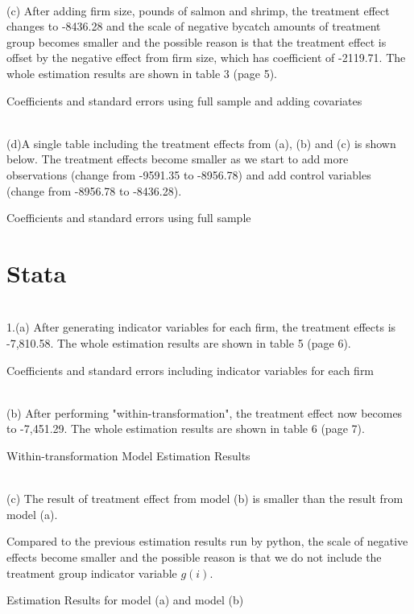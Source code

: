 \documentclass{article}
\begin{document}
~\\(c) After adding firm size, pounds of salmon and shrimp, the treatment effect changes to -8436.28 and the scale of negative bycatch amounts of treatment group becomes smaller and the possible reason is that the treatment effect is offset by the negative effect from firm size, which has coefficient of  -2119.71. The whole estimation results are shown in table 3 (page 5).

\begin{table}[ht]
	
	\small
	\centering
		
	\caption{Coefficients and standard errors using full sample and adding covariates}

\end{table}


~\\(d)A single table including the treatment effects from (a), (b) and (c) is shown below. The treatment effects become smaller as we start to add more observations (change from -9591.35 to -8956.78) and add control variables (change from -8956.78 to -8436.28). 

\begin{table}[H]
	\centering
		
	\caption{Coefficients and standard errors using full sample}
\end{table}

\section{Stata}
~\\1.(a) After generating indicator variables for each firm, the treatment effects is -7,810.58. The whole estimation results are shown in table 5 (page 6).  
\begin{table}[ht]
	\small
	\centering
		
	\caption{Coefficients and standard errors including indicator variables for each firm}
	
\end{table}



~\\(b) After performing "within-transformation", the treatment effect now becomes to -7,451.29. The whole estimation results are shown in table 6 (page 7).  
\begin{table}[ht]
	\small
	\centering
		
	\caption{Within-transformation Model Estimation Results}
	
\end{table}



~\\(c) The result of treatment effect from model (b) is smaller than the result from model (a).
	
	 Compared to the previous estimation results run by python, the scale of negative effects become smaller and the possible reason is that we do not include the treatment group indicator variable $g(i)$. 
\begin{table}[H]
	\centering
		
	\caption{Estimation Results for model (a) and model (b)}
	
\end{table}
\end{document}

